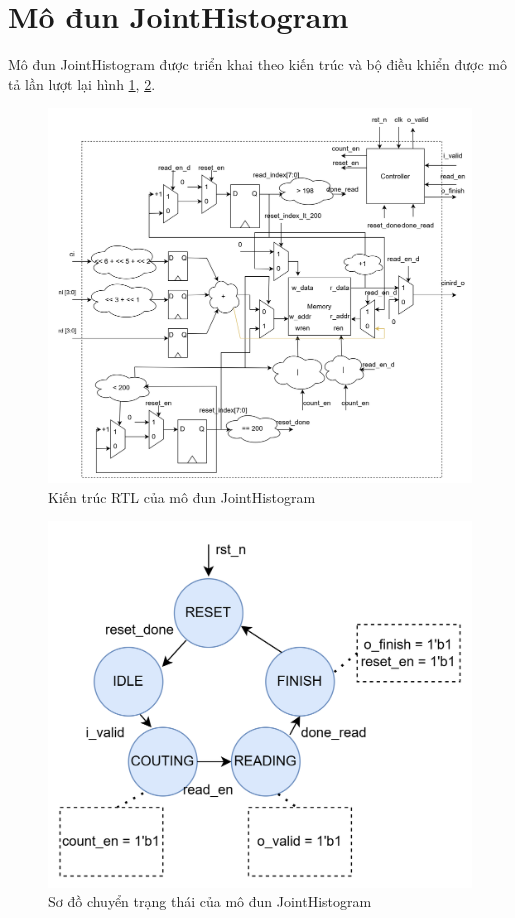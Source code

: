 \section{Mô đun JointHistogram}
Mô đun JointHistogram được triển khai theo kiến trúc và bộ điều khiển được mô tả lần lượt lại hình \ref{fig:jointHistogramRTL}, \ref{fig:jointHistogramTrans}.
\begin{figure}[!ht]
	\centering
	\includegraphics[width=1\linewidth]{figures/jointHistogramRTL.png}
	\caption{Kiến trúc RTL của mô đun JointHistogram}
	\label{fig:jointHistogramRTL}
\end{figure}
\begin{figure}[!ht]
	\centering
	\includegraphics[width=0.5\linewidth]{figures/jointHistogramTrans.png}
	\caption{Sơ đồ chuyển trạng thái của mô đun JointHistogram}
	\label{fig:jointHistogramTrans}
\end{figure}
